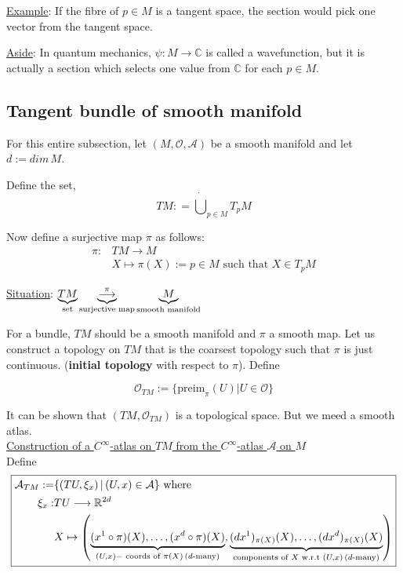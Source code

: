\underline{Example}: If the fibre of $p \in M$ is a tangent space, the section would pick one vector from the tangent space.

\underline{Aside}: In quantum mechanics, $\psi : M \to \mathbb{C}$ is called a wavefunction, but it is actually a section which selects one value from $\mathbb{C}$ for each $p \in M$.


\subsection{Tangent bundle of smooth manifold}
For this entire subsection, let $(M, \mathcal{O}, \mathcal{A})$ be a smooth manifold and let $d := dim \, M$. 

Define the set, 
\begin{equation}
\boxed{TM : = \dot{\bigcup}_{p \in M} T_pM}
\end{equation}

Now define a surjective map $\pi$ as follows:
\begin{equation}
\boxed{\begin{split}
  \pi : & TM \to M \\
  & X \mapsto \pi(X) := p \in M \text{ such that } X \in T_pM
\end{split}}
\end{equation}

\underline{Situation}:  $\underbrace{TM}_{\text{set}} \underbrace{ \stackrel{\pi}{\longrightarrow}}_{\text{surjective map}} \underbrace{M}_{\text{smooth manifold}}$

For a bundle, $TM$ should be a smooth manifold and $\pi$ a smooth map. Let us construct a topology on $TM$ that is the coarsest topology such that $\pi$ is just continuous. (\textbf{initial topology} with respect to $\pi$). Define

\begin{equation}
\boxed{\mathcal{O}_{TM} := \lbrace \text{preim}_{\pi}(U) | U \in \mathcal{O} \rbrace}
\end{equation}

It can be shown that $(TM,\mathcal{O}_{TM})$ is a topological space. But we meed a smooth atlas.\\

\underline{Construction of a $C^{\infty}$-atlas on $TM$ from the $C^{\infty}$-atlas $\mathcal{A}$ on $M$} \\
Define
\begin{equation}\label{eq:atlasTangentBundle}
\boxed{
\begin{split}
\mathcal{A}_{TM} := & \lbrace (TU,\xi_x) \, | \, (U,x) \in \mathcal{A} \rbrace \text{ where } \\
  \xi_x : & TU \longrightarrow \mathbb{R}^{2d} \\
  & X \mapsto \left(\underbrace{(x^1 \circ \pi)(X), \dotsc, (x^d \circ \pi)(X)}_{(U,x)-\text{ coords of } \pi(X) \, (d\text{-many})}, \underbrace{(dx^1)_{\pi(X)}(X), \dotsc, (dx^d)_{\pi(X)}(X)}_{\text{components of $X$ w.r.t } (U,x) \, (d\text{-many})}\right)
\end{split}
}
\end{equation}

